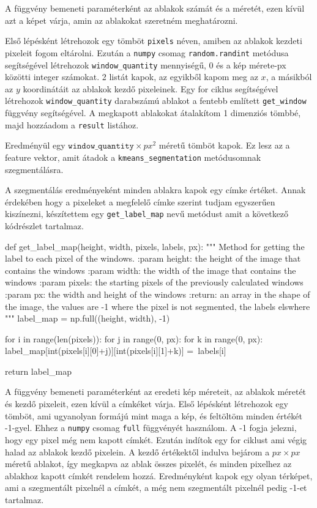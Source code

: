 A függvény bemeneti paraméterként az ablakok számát és a méretét, ezen kívül azt a képet várja, amin az ablakokat szeretném meghatározni.

Első lépésként létrehozok egy tömböt \texttt{pixels} néven, amiben az ablakok kezdeti pixeleit fogom eltárolni. Ezután a \texttt{numpy} csomag \texttt{random.randint} metódusa segítségével létrehozok \texttt{window\_quantity} mennyiségű, 0 és a kép mérete-px közötti integer számokat. 2 listát kapok, az egyikből kapom meg az $x$, a másikból az $y$ koordinátáit az ablakok kezdő pixeleinek. Egy for ciklus segítségével létrehozok \texttt{window\_quantity} darabszámú ablakot a fentebb említett \texttt{get\_window} függvény segítségével. A megkapott ablakokat átalakítom 1 dimenziós tömbbé, majd hozzáadom a \texttt{result} listához.

Eredményül egy $\texttt{window\_quantity} \times px^2$ méretű tömböt kapok. Ez lesz az a feature vektor, amit átadok a \texttt{kmeans\_segmentation} metódusomnak szegmentálásra.

A szegmentálás eredményeként minden ablakra kapok egy címke értéket. Annak érdekében hogy a pixeleket a megfelelő címke szerint tudjam egyszerűen kiszínezni, készítettem egy \texttt{get\_label\_map} nevű metódust amit a következő kódrészlet tartalmaz.

\begin{python}
def get_label_map(height, width, pixels, labels, px):
    """
    Method for getting the label to each pixel of the windows.
    :param height: the height of the image that contains the windows
    :param width: the width of the image that contains the windows
    :param pixels: the starting pixels of the previously
        calculated windows
    :param px: the width and height of the windows
    :return: an array in the shape of the image,
        the values are -1 where the pixel is not segmented,
        the labels elswhere
    """
    label_map = np.full((height, width), -1)

    for i in range(len(pixels)):
        for j in range(0, px):
            for k in range(0, px):
                label_map[int(pixels[i][0]+j)][int(pixels[i][1]+k)] =\
                    labels[i]

    return label_map
\end{python}

A függvény bemeneti paraméterként az eredeti kép méreteit, az ablakok méretét és kezdő pixeleit, ezen kívül a címkéket várja. Első lépésként létrehozok egy tömböt, ami ugyanolyan formájú mint maga a kép, és feltöltöm minden értékét -1-gyel. Ehhez a \texttt{numpy} csomag \texttt{full} függvényét használom. A -1 fogja jelezni, hogy egy pixel még nem kapott címkét. Ezután indítok egy for ciklust ami végig halad az ablakok kezdő pixelein. A kezdő értékektől indulva bejárom a $px \times px$ méretű ablakot, így megkapva az ablak összes pixelét, és minden pixelhez az ablakhoz kapott címkét rendelem hozzá. Eredményként kapok egy olyan térképet, ami a szegmentált pixelnél a címkét, a még nem szegmentált pixelnél pedig -1-et tartalmaz.

